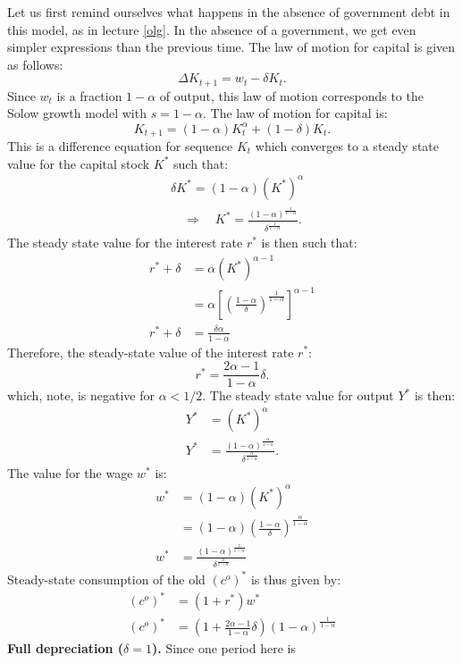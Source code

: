 \documentclass[]{book}
\begin{document}
Let us first remind ourselves what happens in the absence of government
debt in this model, as in lecture \ref{olg}. In the absence of a
government, we get even simpler expressions than the previous time. The
law of motion for capital is given as follows:
\[\Delta K_{t+1}=w_{t}-\delta K_{t}.\] Since \(w_t\) is a fraction
\(1-\alpha\) of output, this law of motion corresponds to the Solow
growth model with \(s = 1-\alpha\). The law of motion for capital is:
\[K_{t+1}=(1-\alpha) K_{t}^{\alpha}+ (1-\delta)K_t.\] This is a
difference equation for sequence \(K_{t}\) which converges to a steady
state value for the capital stock \(K^{*}\) such that: \[
\begin{aligned}
& \delta K^{*} = (1-\alpha)(K^*)^{\alpha}\\
& \quad \Rightarrow \quad K^{*}=\frac{(1-\alpha)^{\frac{1}{1-\alpha}}}{\delta^{\frac{1}{1-\alpha}}}.
\end{aligned}
\] The steady state value for the interest rate \(r^{*}\) is then such
that: \[
\begin{aligned}
r^{*}+\delta&=\alpha(K^{*})^{\alpha-1}\\
&= \alpha \left[\left(\frac{1-\alpha}{\delta}\right)^{\frac{1}{1-\alpha}}\right]^{\alpha-1}\\
r^{*}+\delta &=\frac{\delta \alpha}{1-\alpha}
\end{aligned}
\] Therefore, the steady-state value of the interest rate \(r^{*}\):
\[r^{*} = \frac{2\alpha-1}{1-\alpha}\delta.\] which, note, is negative
for \(\alpha < 1/2\). The steady state value for output \(Y^{*}\) is
then: \[
\begin{aligned}
Y^{*}&=\left(K^{*}\right)^{\alpha}\\
Y^{*}&=\frac{(1-\alpha)^{\frac{\alpha}{1-\alpha}}}{\delta^{\frac{\alpha}{1-\alpha}}}.
\end{aligned}
\] The value for the wage \(w^{*}\) is: \[
\begin{aligned}
w^{*}&=(1-\alpha)\left(K^{*}\right)^{\alpha}\\
&=(1-\alpha) \left(\frac{1-\alpha}{\delta}\right)^{\frac{\alpha}{1-\alpha}}\\
w^{*} &= \frac{\left(1-\alpha\right)^{\frac{1}{1-\alpha}}}{\delta^{\frac{\alpha}{1-\alpha}}}
\end{aligned}
\] Steady-state consumption of the old \((c^{o})^{*}\) is thus given by:
\[
\begin{aligned}
(c^{o})^{*}&=(1+r^*)w^{*}\\
(c^{o})^{*}&=\left(1+ \frac{2\alpha-1}{1-\alpha}\delta\right)\left(1-\alpha\right)^{\frac{1}{1-\alpha}}
\end{aligned}
\] \textbf{Full depreciation (\(\delta = 1\)).} Since one period here is
\end{document}
